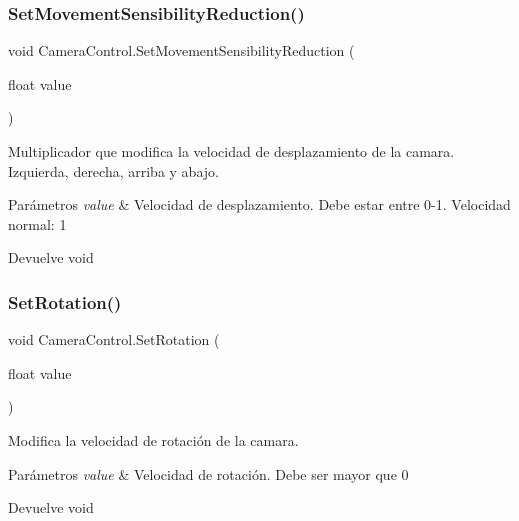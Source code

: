 \subsubsection{\texorpdfstring{SetMovementSensibilityReduction()}{SetMovementSensibilityReduction()}}
{\footnotesize\ttfamily void Camera\+Control.\+Set\+Movement\+Sensibility\+Reduction (\begin{DoxyParamCaption}\item[{float}]{value }\end{DoxyParamCaption})\hspace{0.3cm}{\ttfamily [inline]}}

Multiplicador que modifica la velocidad de desplazamiento de la camara. Izquierda, derecha, arriba y abajo. 
\begin{DoxyParams}{Parámetros}
{\em value} & Velocidad de desplazamiento. Debe estar entre 0-\/1. Velocidad normal\+: 1 \\
\hline
\end{DoxyParams}
\begin{DoxyReturn}{Devuelve}
void 
\end{DoxyReturn}
\mbox{\label{class_camera_control_a7dfdd3783b057fd9941f20a634b95b03}} 
\subsubsection{\texorpdfstring{SetRotation()}{SetRotation()}}
{\footnotesize\ttfamily void Camera\+Control.\+Set\+Rotation (\begin{DoxyParamCaption}\item[{float}]{value }\end{DoxyParamCaption})\hspace{0.3cm}{\ttfamily [inline]}}

Modifica la velocidad de rotación de la camara. 
\begin{DoxyParams}{Parámetros}
{\em value} & Velocidad de rotación. Debe ser mayor que 0 \\
\hline
\end{DoxyParams}
\begin{DoxyReturn}{Devuelve}
void 
\end{DoxyReturn}
\mbox{\label{class_camera_control_a6c7f7816a4bff734280e19f65ef9df87}} 
